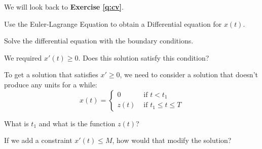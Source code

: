 \documentclass{workbook}
\begin{document}
\begin{slide}
	

\question

We will look back to \textbf{Exercise \ref{q:cv}}.

\begin{parts}
	\item Use the Euler-Lagrange Equation to obtain a Differential equation for $x(t)$.
		
	\item Solve the differential equation with the boundary conditions.
		
	\item We required $x'(t) \geq 0$. Does this solution satisfy this condition?
	
	\item To get a solution that satisfies $x'\geq 0$, we need to consider a solution that doesn't produce any units for a while: 
	\[ x(t) = \begin{cases}
 			0 & \text{ if } t < t_1 \\
 			z(t) & \text{ if } t_1 \leq t \leq T
	 \end{cases}
	 \]
	 
	 What is $t_1$ and what is the function $z(t)$?	
	
	\item If we add a constraint $x'(t) \leq M$, how would that modify the solution?
	
\end{parts}
\end{slide}
\end{document}
